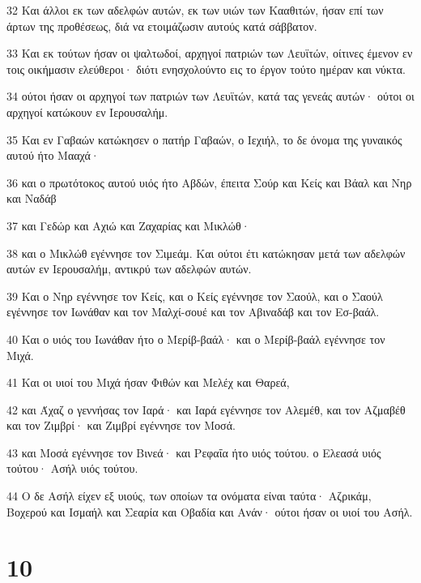 \par 32 Και άλλοι εκ των αδελφών αυτών, εκ των υιών των Κααθιτών, ήσαν επί των άρτων της προθέσεως, διά να ετοιμάζωσιν αυτούς κατά σάββατον.
\par 33 Και εκ τούτων ήσαν οι ψαλτωδοί, αρχηγοί πατριών των Λευϊτών, οίτινες έμενον εν τοις οικήμασιν ελεύθεροι· διότι ενησχολούντο εις το έργον τούτο ημέραν και νύκτα.
\par 34 ούτοι ήσαν οι αρχηγοί των πατριών των Λευϊτών, κατά τας γενεάς αυτών· ούτοι οι αρχηγοί κατώκουν εν Ιερουσαλήμ.
\par 35 Και εν Γαβαών κατώκησεν ο πατήρ Γαβαών, ο Ιεχιήλ, το δε όνομα της γυναικός αυτού ήτο Μααχά·
\par 36 και ο πρωτότοκος αυτού υιός ήτο Αβδών, έπειτα Σούρ και Κείς και Βάαλ και Νηρ και Ναδάβ
\par 37 και Γεδώρ και Αχιώ και Ζαχαρίας και Μικλώθ·
\par 38 και ο Μικλώθ εγέννησε τον Σιμεάμ. Και ούτοι έτι κατώκησαν μετά των αδελφών αυτών εν Ιερουσαλήμ, αντικρύ των αδελφών αυτών.
\par 39 Και ο Νηρ εγέννησε τον Κείς, και ο Κείς εγέννησε τον Σαούλ, και ο Σαούλ εγέννησε τον Ιωνάθαν και τον Μαλχί-σουέ και τον Αβιναδάβ και τον Εσ-βαάλ.
\par 40 Και ο υιός του Ιωνάθαν ήτο ο Μερίβ-βαάλ· και ο Μερίβ-βαάλ εγέννησε τον Μιχά.
\par 41 Και οι υιοί του Μιχά ήσαν Φιθών και Μελέχ και Θαρεά,
\par 42 και Άχαζ ο γεννήσας τον Ιαρά· και Ιαρά εγέννησε τον Αλεμέθ, και τον Αζμαβέθ και τον Ζιμβρί· και Ζιμβρί εγέννησε τον Μοσά.
\par 43 και Μοσά εγέννησε τον Βινεά· και Ρεφαΐα ήτο υιός τούτου. ο Ελεασά υιός τούτου· Ασήλ υιός τούτου.
\par 44 Ο δε Ασήλ είχεν εξ υιούς, των οποίων τα ονόματα είναι ταύτα· Αζρικάμ, Βοχερού και Ισμαήλ και Σεαρία και Οβαδία και Ανάν· ούτοι ήσαν οι υιοί του Ασήλ.

\chapter{10}

